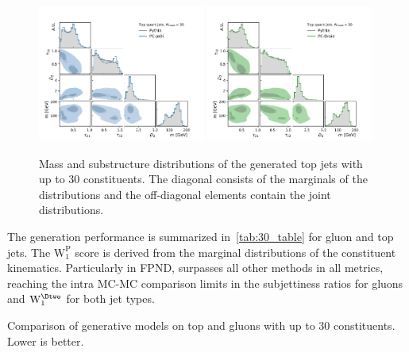 \begin{figure}[htpb]
    \centering
    \includegraphics[width=0.49\textwidth]{Figures/jet_generation/droid/30/hlvs/t/100/hlv_corr_PC-Jedi.pdf}
    \includegraphics[width=0.49\textwidth]{Figures/jet_generation/droid/30/hlvs/t/100/hlv_corr_PC-Droid.pdf}
    \caption{
        Mass and substructure distributions of the generated top jets with up to 30 constituents.
        The diagonal consists of the marginals of the distributions and the off-diagonal elements contain the joint distributions.
    }
    \label{fig:hlvs-30}
\end{figure}

The generation performance is summarized in~\cref{tab:30_table} for gluon and top jets.
The $\mathrm{W_1^P}$ score is derived from the marginal distributions of the constituent kinematics.
Particularly in FPND, \pcdroid surpasses all other methods in all metrics, reaching the intra MC-MC comparison limits in the subjettiness ratios for gluons and $\mathrm{W_1^{\Dtwo}}$ for both jet types.

\begin{table}[tp]
    \centering
    \caption{Comparison of generative models on top and gluons with up to 30 constituents. Lower is better.}
    \label{tab:30_table}
    \renewcommand{\arraystretch}{1.5}
    \resizebox{\textwidth}{!}{%
        
    }
\end{table}

